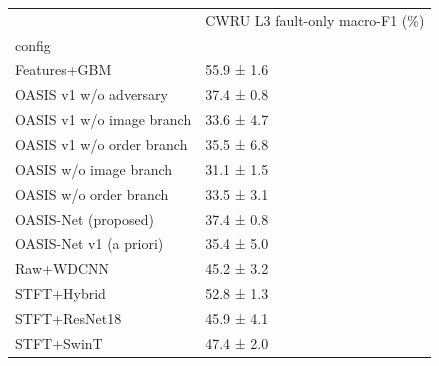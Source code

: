 \begin{tabular}{ll}
\toprule
 & CWRU L3 fault-only macro-F1 (\%) \\
config &  \\
\midrule
Features+GBM & 55.9 ± 1.6 \\
OASIS v1 w/o adversary & 37.4 ± 0.8 \\
OASIS v1 w/o image branch & 33.6 ± 4.7 \\
OASIS v1 w/o order branch & 35.5 ± 6.8 \\
OASIS w/o image branch & 31.1 ± 1.5 \\
OASIS w/o order branch & 33.5 ± 3.1 \\
OASIS-Net (proposed) & 37.4 ± 0.8 \\
OASIS-Net v1 (a priori) & 35.4 ± 5.0 \\
Raw+WDCNN & 45.2 ± 3.2 \\
STFT+Hybrid & 52.8 ± 1.3 \\
STFT+ResNet18 & 45.9 ± 4.1 \\
STFT+SwinT & 47.4 ± 2.0 \\
\bottomrule
\end{tabular}
